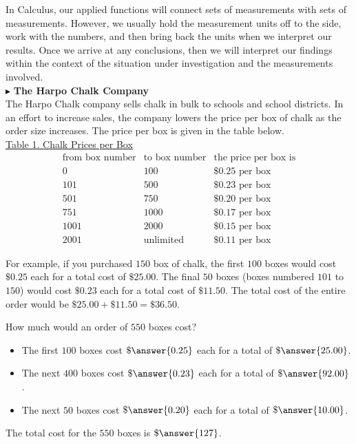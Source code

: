 \documentclass{ximera}
\begin{document}
In Calculus, our applied functions will connect sets of measurements with sets of measurements. However, we usually hold the measurement units off to the side, work with the numbers, and then bring back the units when we interpret our results.  Once we arrive at any conclusions, then we will interpret our findings within the context of the situation under investigation and the measurements involved. \\




$\blacktriangleright$ \textbf{The Harpo Chalk Company} \\

The Harpo Chalk company sells chalk in bulk to schools and school districts. In an effort to increase sales, the company lowers the price per box of chalk as the order size increases.  The price per box is given in the table below. \\




\underline{Table 1. Chalk Prices per Box}
\[
\begin{array}{lll}
\text{from box number} & \text{to box number}  & \text{the price per box is} \\
0 &  100 &  \$0.25 \text{ per box}   \\
101 &  500 &  \$0.23 \text{ per box}   \\
501 &  750 &  \$0.20 \text{ per box}   \\
751 &  1000 &  \$0.17 \text{ per box}   \\
1001 &  2000 &  \$0.15 \text{ per box}   \\
2001 &  \text{unlimited} &  \$0.11 \text{ per box}   
\end{array}
\]




For example, if you purchased $150$ box of chalk, the first $100$ boxes would cost $\$0.25$ each for a total cost of $\$25.00$.  The final $50$ boxes (boxes numbered $101$ to $150$) would cost $\$0.23$ each for a total cost of $\$11.50$.  The total cost of the entire order would be $\$25.00 + \$11.50 = \$36.50$.


\begin{question}
How much would an order of $550$ boxes cost?

\begin{explanation}

\begin{itemize}
\item The first $100$ boxes cost $\$\answer{0.25}$ each for a total of $\$\answer{25.00}$.
\item The next $400$ boxes cost $\$\answer{0.23}$ each for a total of $\$\answer{92.00}$.
\item The next $50$ boxes cost $\$\answer{0.20}$ each for a total of $\$\answer{10.00}$.
\end{itemize}

The total cost for the $550$ boxes is $\$\answer{127}$.
\end{explanation}
\end{question}
\end{document}
